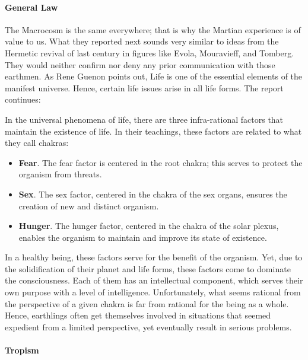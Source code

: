 \paragraph{General Law}


The Macrocosm is the same everywhere; that is why the Martian experience is of value to us. What they reported next sounds very similar to ideas from the Hermetic revival of last century in figures like Evola, Mouravieff, and Tomberg. They would neither confirm nor deny any prior communication with those earthmen. As Rene Guenon points out, Life is one of the essential elements of the manifest universe. Hence, certain life issues arise in all life forms. The report continues:

\begin{quotex}
In the universal phenomena of life, there are three infra-rational factors that maintain the existence of life. In their teachings, these factors are related to what they call chakras:

\begin{itemize}


\item \textbf{Fear}. The fear factor is centered in the root chakra; this serves to protect the organism from threats.

\item \textbf{Sex}. The sex factor, centered in the chakra of the sex organs, ensures the creation of new and distinct organism.

\item \textbf{Hunger}. The hunger factor, centered in the chakra of the solar plexus, enables the organism to maintain and improve its state of existence.
\end{itemize}

In a healthy being, these factors serve for the benefit of the organism. Yet, due to the solidification of their planet and life forms, these factors come to dominate the consciousness. Each of them has an intellectual component, which serves their own purpose with a level of intelligence. Unfortunately, what seems rational from the perspective of a given chakra is far from rational for the being as a whole. Hence, earthlings often get themselves involved in situations that seemed expedient from a limited perspective, yet eventually result in serious problems.
\end{quotex}


\paragraph{Tropism}


